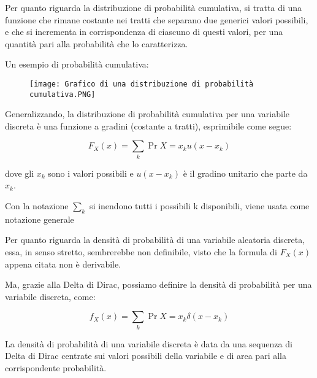 Per quanto riguarda la distribuzione di probabilità cumulativa, si tratta di una funzione che rimane costante nei tratti che separano due generici valori possibili, e che si incrementa in corrispondenza 
di ciascuno di questi valori, per una quantità pari alla probabilità che lo caratterizza. \newline 

Un esempio di probabilità cumulativa: 

\begin{figure}[h]
    \centering
    \texttt{[image: Grafico di una distribuzione di probabilità cumulativa.PNG]}
\end{figure} 

Generalizzando, la distribuzione di probabilità cumulativa per una variabile discreta è una funzione a 
gradini (costante a tratti), esprimibile come segue: 

{
    \Large 
    \begin{equation}
        F_X (x) 
        = 
        \sum_{k} 
        \Pr{X = x_k} 
        u(x - x_k)
    \end{equation}
}

dove gli $x_k$ sono i valori possibili e $u (x - x_k)$ è il gradino unitario che parte da $x_k$. \newline 

\begin{tcolorbox}
    Con la notazione $\sum_{k}$ si inendono tutti i possibili k disponibili, viene usata come notazione generale
\end{tcolorbox}

Per quanto riguarda la densità di probabilità di una variabile aleatoria discreta, essa, in senso stretto, 
sembrerebbe non definibile, visto che la formula di $F_X (x)$ appena citata non è derivabile. \newline 

Ma, grazie alla Delta di Dirac, possiamo definire la densità di probabilità per una variabile discreta, come: 

{
    \Large 
    \begin{equation}
        f_X (x) 
        = 
        \sum_{k} 
        \Pr{X = x_k} 
        \delta(x - x_k)
    \end{equation}
}

La densità di probabilità di una variabile discreta è data da una sequenza di Delta di Dirac centrate sui valori possibili della variabile e di area pari alla corrispondente probabilità. \newline 

